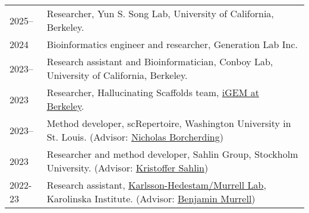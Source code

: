 
\begin{longtable}[l]{@{}p{} p{}}

    2025-- & Researcher, Yun S. Song Lab, University of California, Berkeley. \\

    2024 & Bioinformatics engineer and researcher, Generation Lab Inc. \\

    2023-- & Research assistant and Bioinformatician, Conboy Lab, University of California, Berkeley.\\

    2023 & Researcher, Hallucinating Scaffolds team, \href{https://igem.studentorg.berkeley.edu/teams/hallucinating-scaffolds/}{iGEM at Berkeley}. \\

    2023-- & Method developer, scRepertoire, Washington University in St. Louis. (Advisor: \href{https://www.borch.dev/}{Nicholas Borcherding})\\

    2023 & Researcher and method developer, Sahlin Group, Stockholm University. (Advisor: \href{https://www.scilifelab.se/researchers/kristoffer-sahlin/}{Kristoffer Sahlin}) \\

    2022-23 & Research assistant, \href{https://ki.se/en/people/benjamin-murrell}{Karlsson-Hedestam/Murrell Lab}, Karolinska Institute. (Advisor: \href{https://ki.se/en/people/benjamin-murrell}{Benjamin Murrell}) \\

\end{longtable}
